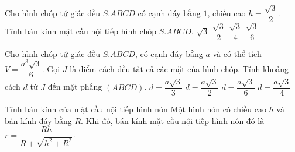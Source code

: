 \begin{vd}%
Cho hình chóp tứ giác đều $S.ABCD$ có cạnh đáy bằng $1$, chiều cao $h=\dfrac{\sqrt{3}}{2}$. Tính bán kính mặt cầu nội tiếp hình chóp $S.ABCD$.
\choice
{$\sqrt{3}$}
{$\dfrac{\sqrt{3}}{2}$}
{$\dfrac{\sqrt{3}}{4}$}
{\True $\dfrac{\sqrt{3}}{6}$}
\end{vd}

\begin{vd}%
Cho hình chóp tứ giác đều $S.ABCD$, có cạnh đáy bằng $a$ và có thể tích $V=\dfrac{a^3\sqrt{3}}{6}$. Gọi $J$ là điểm cách đều tất cả các mặt của hình chóp. Tính khoảng cách $d$ từ $J$ đến mặt phẳng $(ABCD)$. 
\choice
{$d=\dfrac{a\sqrt{3}}{3}$}
{$d=\dfrac{a\sqrt{3}}{2}$}
{\True $d=\dfrac{a\sqrt{3}}{6}$}
{$d=\dfrac{a\sqrt{3}}{4}$}
\end{vd}

\begin{dang}{Tính bán kính của mặt cầu nội tiếp hình nón}
Một hình nón có chiều cao $h$ và bán kính đáy bằng $R$. Khi đó, bán kính mặt cầu nội tiếp hình nón đó là $r=\dfrac{Rh}{R+\sqrt{h^2+R^2}}$.
\end{dang}


